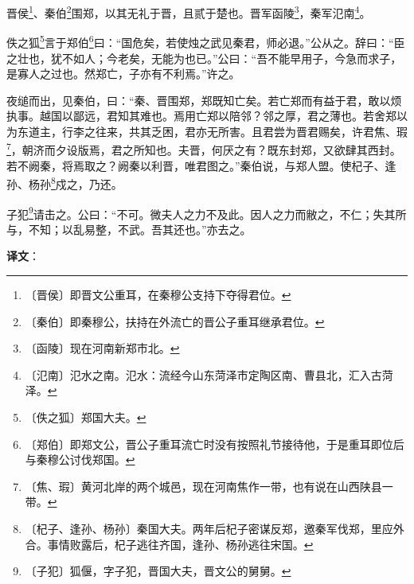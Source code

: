 \documentclass[12pt,UTF-8,openany,a4]{ctexbook}
\begin{document}
\begin{large}
    
    晋侯\footnote{〔晋侯〕\yiwen 即晋文公重耳，在秦穆公支持下夺得君位。}、秦伯\footnote{〔秦伯〕\yiwen 即秦穆公，扶持在外流亡的晋公子重耳继承君位。}围郑，以其无礼于晋，且贰于楚也。晋军函陵\footnote{〔函陵〕\yiwen 现在河南新郑市北。}，秦军氾南\footnote{〔氾南〕\yiwen 氾水之南。氾水：流经今山东菏泽市定陶区南、曹县北，汇入古菏泽。}。
    
    佚之狐\footnote{〔佚之狐〕\yiwen 郑国大夫。}言于郑伯\footnote{〔郑伯〕\yiwen 即郑文公，晋公子重耳流亡时没有按照礼节接待他，于是重耳即位后与秦穆公讨伐郑国。}曰：“国危矣，若使烛之武见秦君，师必退。”公从之。辞曰：“臣之壮也，犹不如人；今老矣，无能为也已。”公曰：“吾不能早用子，今急而求子，是寡人之过也。然郑亡，子亦有不利焉。”许之。
    
    夜缒而出，见秦伯，曰：“秦、晋围郑，郑既知亡矣。若亡郑而有益于君，敢以烦执事。越国以鄙远，君知其难也。焉用亡郑以陪邻？邻之厚，君之薄也。若舍郑以为东道主，行李之往来，共其乏困，君亦无所害。且君尝为晋君赐矣，许君焦、瑕\footnote{〔焦、瑕〕\yiwen 黄河北岸的两个城邑，现在河南焦作一带，也有说在山西陕县一带。}，朝济而夕设版焉，君之所知也。夫晋，何厌之有？既东封郑，又欲肆其西封。若不阙秦，将焉取之？阙秦以利晋，唯君图之。”秦伯说，与郑人盟。使杞子、逢孙、杨孙\footnote{〔杞子、逢孙、杨孙〕\yiwen 秦国大夫。两年后杞子密谋反郑，邀秦军伐郑，里应外合。事情败露后，杞子逃往齐国，逢孙、杨孙逃往宋国。}戍之，乃还。
    
    子犯\footnote{〔子犯〕\yiwen 狐偃，字子犯，晋国大夫，晋文公的舅舅。}请击之。公曰：“不可。微夫人之力不及此。因人之力而敝之，不仁；失其所与，不知；以乱易整，不武。吾其还也。”亦去之。

\end{large}


\newpage

\begin{Large}
   \noindent \textbf{译文}：
\end{Large}

\vspace{1em}
\end{document}
